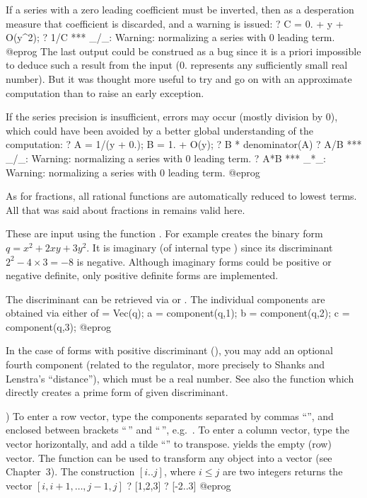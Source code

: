 If a series with a zero leading coefficient must be inverted, then as a
desperation measure that coefficient is discarded, and a warning is issued:
\bprog
? C = 0. + y + O(y^2);
? 1/C
  *** _/_: Warning: normalizing a series with 0 leading term.
@eprog\noindent
The last output could be construed as a bug since it is a priori impossible
to deduce such a result from the input ($0.$ represents any sufficiently
small real number). But it was thought more useful to try and go on with an
approximate computation than to raise an early exception.

If the series precision is insufficient, errors may occur (mostly division
by $0$), which could have been avoided by a better global understanding of
the computation:
\bprog
? A = 1/(y + 0.); B = 1. + O(y);
? B * denominator(A)
? A/B
  *** _/_: Warning: normalizing a series with 0 leading term.
? A*B
  *** _*_: Warning: normalizing a series with 0 leading term.
@eprog

%
As for fractions, all rational functions are automatically reduced to lowest
terms. All that was said about fractions in  remains valid
here.

%
These are input using the function . For example 
creates the binary form $q = x^2+2xy+3y^2$. It is imaginary (of internal type
) since its discriminant $2^2 - 4\times 3 = -8$ is negative.
Although imaginary forms could be positive or negative definite, only
positive definite forms are implemented.

The discriminant can be retrieved via  or . The
individual components are obtained via either of
\bprog
  [a,b,c] = Vec(q);
  a = component(q,1);
  b = component(q,2);
  c = component(q,3);
@eprog

In the case of forms with positive discriminant (), you may add an
optional fourth component (related to the regulator, more precisely to Shanks
and Lenstra's ``distance''), which must be a real number. See also the
function  which directly creates a prime form of given
discriminant.

%
)
To enter a row vector, type the components separated by commas ``\kbd{,}'',
and enclosed between brackets ``\kbd{[}$\,$'' and ``$\,$\kbd{]}'',
e.g.~\kbd{[1,2,3]}. To enter a column vector, type the vector horizontally,
and add a tilde ``\til'' to transpose. \kbd{[ ]} yields the empty (row)
vector. The function  can be used to transform any object into a
vector (see Chapter~3). The construction $[i..j]$, where $i \leq j$ are two
integers returns the vector $[i, i+1,\dots, j-1, j]$
\bprog
? [1,2,3]
? [-2..3]
@eprog

